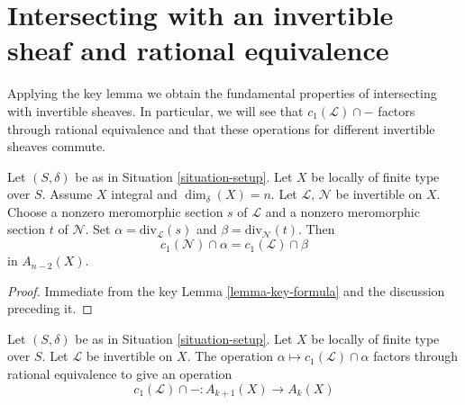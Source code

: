 \section{Intersecting with an invertible sheaf and rational equivalence}
\label{section-commutativity}

\noindent
Applying the key lemma we obtain the fundamental properties of intersecting
with invertible sheaves. In particular, we will see that
$c_1(\mathcal{L}) \cap -$ factors through rational equivalence and
that these operations for different invertible sheaves commute.

\begin{lemma}
\label{lemma-commutativity-on-integral}
Let $(S, \delta)$ be as in Situation \ref{situation-setup}.
Let $X$ be locally of finite type over $S$.
Assume $X$ integral and $\dim_\delta(X) = n$.
Let $\mathcal{L}$, $\mathcal{N}$ be invertible on $X$.
Choose a nonzero meromorphic section $s$ of $\mathcal{L}$
and a nonzero meromorphic section $t$ of $\mathcal{N}$.
Set $\alpha = \text{div}_\mathcal{L}(s)$ and
$\beta = \text{div}_\mathcal{N}(t)$.
Then
$$
c_1(\mathcal{N}) \cap \alpha
=
c_1(\mathcal{L}) \cap \beta
$$
in $A_{n - 2}(X)$.
\end{lemma}

\begin{proof}
Immediate from the key Lemma \ref{lemma-key-formula}
and the discussion preceding it.
\end{proof}

\begin{lemma}
\label{lemma-factors}
Let $(S, \delta)$ be as in Situation \ref{situation-setup}.
Let $X$ be locally of finite type over $S$.
Let $\mathcal{L}$ be invertible on $X$.
The operation $\alpha \mapsto c_1(\mathcal{L}) \cap \alpha$
factors through rational equivalence to give an operation
$$
c_1(\mathcal{L}) \cap - : A_{k + 1}(X) \to A_k(X)
$$
\end{lemma}

